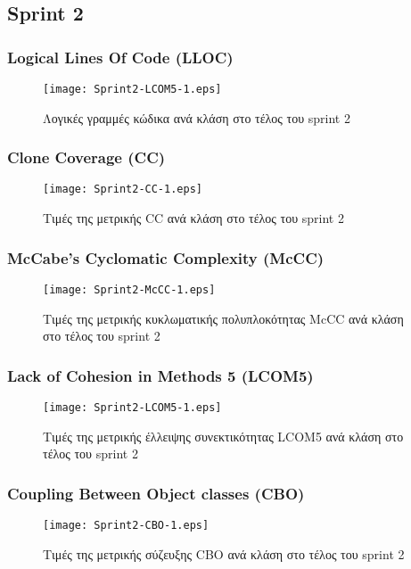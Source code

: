 \subsection{Sprint 2}

\subsubsection{Logical Lines Of Code (LLOC)}
\label{section:sprint2LLOC}

\begin{figure}
\centering
\texttt{[image: Sprint2-LCOM5-1.eps]}
\caption{Λογικές γραμμές κώδικα ανά κλάση στο τέλος του sprint 2}
\label{fig:sprint2LCOM5}
\end{figure}

\subsubsection{Clone Coverage (CC)}
\label{section:sprint2CC}

\begin{figure}
\centering
\texttt{[image: Sprint2-CC-1.eps]}
\caption{Τιμές της μετρικής CC ανά κλάση στο τέλος του sprint 2}
\label{fig:sprint2CC}
\end{figure}

\subsubsection{McCabe’s Cyclomatic Complexity (McCC)}
\label{section:sprint2McCC}

\begin{figure}
\centering
\texttt{[image: Sprint2-McCC-1.eps]}
\caption{Τιμές της μετρικής κυκλωματικής πολυπλοκότητας McCC ανά κλάση στο τέλος του sprint 2}
\label{fig:sprint2McCC}
\end{figure}

\subsubsection{Lack of Cohesion in Methods 5 (LCOM5)}
\label{section:sprint2LCOM5}

\begin{figure}
\centering
\texttt{[image: Sprint2-LCOM5-1.eps]}
\caption{Τιμές της μετρικής έλλειψης συνεκτικότητας LCOM5 ανά κλάση στο τέλος του sprint 2}
\label{fig:sprint2LCOM5}
\end{figure}

\subsubsection{Coupling Between Object classes (CBO)}
\label{section:sprint2CBO}

\begin{figure}
\centering
\texttt{[image: Sprint2-CBO-1.eps]}
\caption{Τιμές της μετρικής σύζευξης CBO ανά κλάση στο τέλος του sprint 2}
\label{fig:sprint2CBO}
\end{figure}
